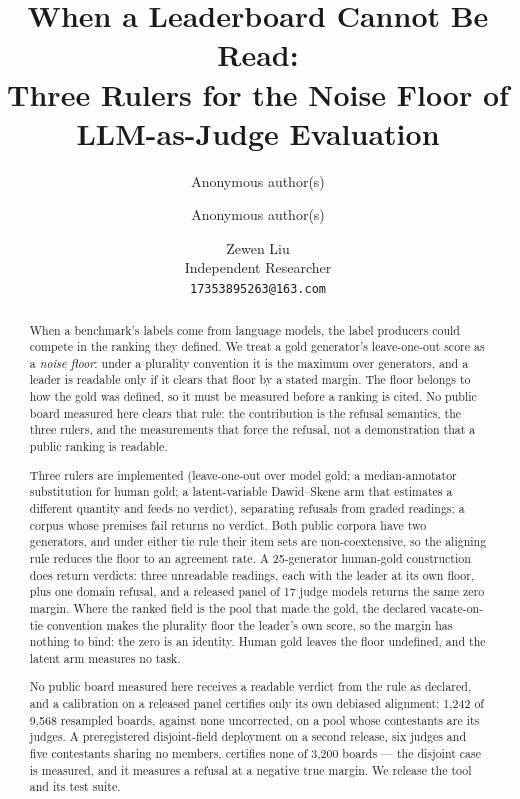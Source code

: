 \documentclass{article}
\title{\bfseries When a Leaderboard Cannot Be Read:\\ Three Rulers for the Noise Floor of\\ LLM-as-Judge Evaluation}
\author{Anonymous author(s)}
\author{Anonymous author(s)}
\author{Zewen Liu \\ Independent Researcher \\ \texttt{17353895263@163.com}}
\date{}
\begin{document}
\maketitle
\begin{abstract}
\noindent When a benchmark's labels come from language models, the label producers could compete in the ranking they
defined. We treat a gold generator's leave-one-out score as a \emph{noise floor}: under a plurality convention it is
the maximum over generators, and a leader is readable only if it clears that floor by a stated margin. The floor belongs to how the gold was defined, so it must be measured before a ranking is cited.
No public board measured here clears that rule: the contribution is the refusal semantics,
the three rulers, and the measurements that force the refusal, not a demonstration that a
public ranking is readable.

Three rulers are implemented (leave-one-out over model gold; a median-annotator substitution for human gold; a
latent-variable Dawid--Skene arm that estimates a different quantity and feeds no verdict), separating refusals from graded readings: a corpus whose premises fail returns no verdict. Both public corpora have two generators, and under either tie rule their item sets are
non-coextensive, so the aligning rule reduces the floor to an agreement rate. A 25-generator human-gold construction does return verdicts:
three unreadable readings, each with the leader at its own floor, plus one domain refusal, and a released panel of 17 judge models returns the same zero margin. Where the ranked
field is the pool that made the gold, the declared \mbox{vacate-on-tie} convention makes the plurality floor the leader's own score, so the margin has nothing to bind: the zero is an identity. Human gold leaves the floor undefined, and the latent arm measures no task.

No public board measured here receives a readable verdict from the rule as declared, and a calibration on a released panel certifies only its own debiased
alignment: 1,242 of 9,568 resampled boards, against none uncorrected, on a pool whose contestants are its
judges. A preregistered disjoint-field deployment on a second release, six judges and five contestants sharing
no members, certifies none of 3,200 boards --- the disjoint case is measured, and it measures a refusal at a
negative true margin. We release the tool and its test suite.
\end{abstract}
\end{document}
